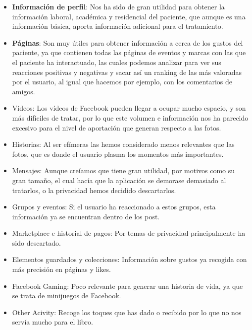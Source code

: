 \begin{itemize}
	\item \textbf{Información de perfil}: Nos ha sido de gran utilidad para obtener la información laboral, académica y residencial del paciente, que aunque es una información básica, aporta información adicional para el tratamiento.
	
	\item \textbf{Páginas}: Son muy útiles para obtener información a cerca de los gustos del paciente, ya que contienen todas las páginas de eventos y marcas con las que el paciente ha interactuado, las cuales podemos analizar para ver sus reacciones positivas y negativas y sacar así un ranking de las más valoradas por el usuario, al igual que hacemos por ejemplo, con los comentarios de amigos.
	
	\item Vídeos: Los vídeos de Facebook pueden llegar a ocupar mucho espacio, y son más difíciles de tratar, por lo que este volumen e información nos ha parecido excesivo para el nivel de aportación que generan respecto a las fotos.
	
	\item Historias: Al ser efímeras las hemos considerado menos relevantes que las fotos, que es donde el usuario plasma los momentos más importantes.
	
	\item Mensajes: Aunque creíamos que tiene gran utilidad, por motivos como su gran tamaño, el cual hacía que la aplicación se demorase demasiado al tratarlos, o la privacidad hemos decidido descartarlos.
	
	\item Grupos y eventos: Si el usuario ha reaccionado a estos grupos, esta información ya se encuentran dentro de los post.
	
	\item Marketplace e historial de pagos: Por temas de privacidad principalmente ha sido descartado.
	
	\item Elementos guardados y colecciones: Información sobre gustos ya recogida con más precisión en páginas y likes.

	
	\item Facebook Gaming: Poco relevante para generar una historia de vida, ya que se trata de minijuegos de Facebook.
	
	\item Other Acivity: Recoge los toques que has dado o recibido por lo que no nos servía mucho para el libro.
	

\end{itemize}
